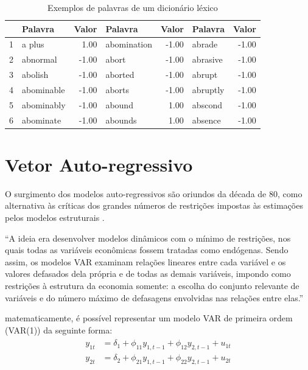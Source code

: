 \begin{table}[!h]
\centering
\caption{Exemplos de palavras de um dicionário léxico}
\begin{tabular}{rlrlrlr}
  \hline
 & \textbf{Palavra} & \textbf{Valor} & \textbf{Palavra} & \textbf{Valor} & \textbf{Palavra} & \textbf{Valor} \\ 
  \hline
1 & a plus & 1.00 & abomination & -1.00 & abrade & -1.00 \\ 
  2 & abnormal & -1.00 & abort & -1.00 & abrasive & -1.00 \\ 
  3 & abolish & -1.00 & aborted & -1.00 & abrupt & -1.00 \\ 
  4 & abominable & -1.00 & aborts & -1.00 & abruptly & -1.00 \\ 
  5 & abominably & -1.00 & abound & 1.00 & abscond & -1.00 \\ 
  6 & abominate & -1.00 & abounds & 1.00 & absence & -1.00 \\ 
   \hline
\end{tabular}
\label{tab:lexico}
\end{table}

\section{Vetor Auto-regressivo}

O surgimento dos modelos auto-regressivos são oriundos da década de 80, como alternativa às críticas dos grandes números de restrições impostas às estimações pelos modelos estruturais . 

\begin{citacao}
``A ideia era desenvolver modelos dinâmicos com o mínimo de restrições, nos quais todas as variáveis econômicas
fossem tratadas como endógenas. Sendo assim, os modelos VAR examinam relações lineares entre cada variável e os valores defasados dela própria e de todas as demais variáveis, impondo como restrições à estrutura da economia somente: a escolha do conjunto relevante de variáveis e do número máximo de defasagens envolvidas nas relações entre elas.'' \cite[p.1]{var2012bcb}
\end{citacao}

\noindent
matematicamente, é possível representar um modelo VAR de primeira ordem (VAR(1)) da seguinte forma:
\begin{align} \label{var1}
\begin{split}
    y_{1t} &= \delta_1 + \phi_{11}y_{1,t-1} + \phi_{12}y_{2,t-1} + u_{1t} \\
    y_{2t} &= \delta_2 + \phi_{21}y_{1,t-1} + \phi_{22}y_{2,t-1} + u_{2t}
\end{split}
\end{align}

